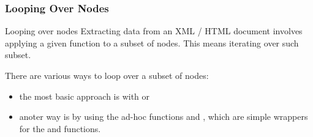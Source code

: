 \documentclass{beamer}\usepackage[]{graphicx}\usepackage[]{color}
\begin{document}

\begin{frame}[fragile]
\frametitle{Looping Over Nodes}

\begin{block}{Looping over nodes}
Extracting data from an XML / HTML document involves applying a given function to a subset of nodes. This means iterating over such subset.

\bigskip
There are various ways to loop over a subset of nodes:
\begin{itemize}
 \item the most basic approach is with  or 
 \item anoter way is by using the ad-hoc functions  and , which are simple wrappers for the  and  functions. 
\end{itemize}
\end{block}

\end{frame}

\end{document}
